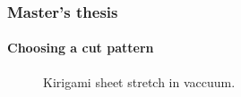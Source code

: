\documentclass[
	10pt, %
]{beamer}
\begin{document}



\begin{frame}
	\frametitle{Master's thesis}
	\framesubtitle{Choosing a cut pattern}
	\begin{figure}
		\centering    
		\caption{Kirigami sheet stretch in vaccuum.}
   \end{figure} 
\end{frame}
\end{document}
